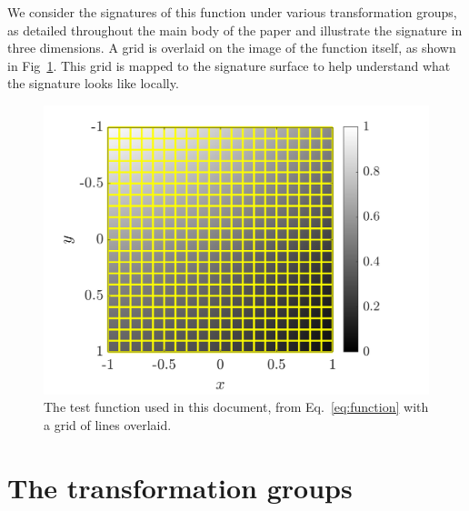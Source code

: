 \documentclass[11pt]{article}
\begin{document}
We consider the signatures of this function under various transformation
groups, as detailed throughout the main body of the paper and illustrate
the signature in three dimensions. A grid is overlaid on the image of the
function itself, as shown in Fig~\ref{fig:function_scanlines}. This grid is
mapped to the signature surface to help understand what the signature looks
like locally.
\begin{figure}
  \centering
  \includegraphics[width=12cm]{figures/function_scanlines}
  \caption{The test function used in this document, from
  Eq.~\eqref{eq:function} with a grid of lines
overlaid.}\label{fig:function_scanlines}
\end{figure}


\section{The transformation groups}
\end{document}
